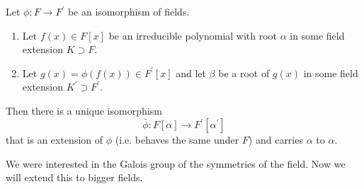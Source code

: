   \begin{theorem}
    Let $\phi: F \to F^\prime$ be an isomorphism of fields.
    \begin{enumerate}
      \item Let $f(x) \in F[x]$ be an irreducible polynomial with root $\alpha$ in some field extension $K \supset F$.
      \item Let $g(x) = \phi(f(x)) \in F^\prime[x]$ and let $\beta$ be a root of $g(x)$ in some field extension $K^\prime \supset F^\prime$. 
    \end{enumerate}
    Then there is a unique isomorphism  
    \begin{equation}
      \bar{\phi} : F[\alpha] \to F^\prime [\alpha^\prime]
    \end{equation}
    that is an extension of $\phi$ (i.e. behaves the same under $F$) and carries $\alpha$ to $\alpha$. 
  \end{theorem}

  We were interested in the Galois group of the symmetries of the field. Now we will extend this to bigger fields. 

